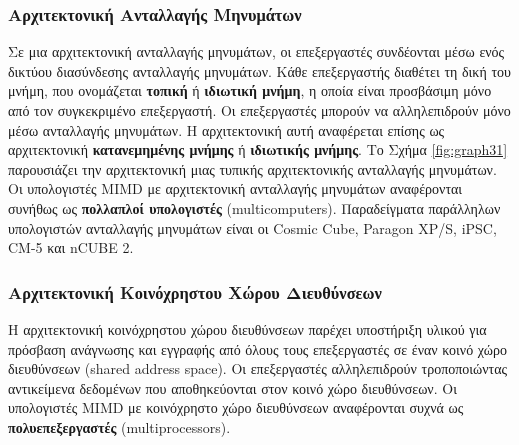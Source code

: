 \documentclass[12pt,a4paper]{article}
\begin{document}
\subsubsection*{Αρχιτεκτονική Ανταλλαγής Μηνυμάτων}
Σε μια αρχιτεκτονική ανταλλαγής μηνυμάτων, οι επεξεργαστές συνδέονται 
μέσω ενός δικτύου διασύνδεσης ανταλλαγής μηνυμάτων.  Κάθε επεξεργαστής 
διαθέτει τη δική του μνήμη, που ονομάζεται \textbf{τοπική} ή \textbf{ιδιωτική μνήμη}, 
η οποία είναι προσβάσιμη μόνο από τον συγκεκριμένο επεξεργαστή. Οι 
επεξεργαστές μπορούν να αλληλεπιδρούν μόνο μέσω ανταλλαγής μηνυμάτων.  
Η αρχιτεκτονική αυτή αναφέρεται επίσης ως αρχιτεκτονική \textbf{κατανεμημένης μνήμης} 
ή \textbf{ιδιωτικής μνήμης}. Το Σχήμα \ref{fig:graph31} παρουσιάζει την αρχιτεκτονική 
μιας τυπικής αρχιτεκτονικής ανταλλαγής μηνυμάτων. Οι υπολογιστές \foreignlanguage{english}{MIMD} 
με αρχιτεκτονική ανταλλαγής μηνυμάτων αναφέρονται συνήθως ως 
\textbf{πολλαπλοί υπολογιστές} (\foreignlanguage{english}{multicomputers}). Παραδείγματα παράλληλων υπολογιστών ανταλλαγής 
μηνυμάτων είναι οι \foreignlanguage{english}{Cosmic Cube, Paragon XP/S, iPSC, CM-5} και \foreignlanguage{english}{nCUBE 2}.

\subsubsection*{Αρχιτεκτονική Κοινόχρηστου Χώρου Διευθύνσεων}
Η αρχιτεκτονική κοινόχρηστου χώρου διευθύνσεων παρέχει υποστήριξη υλικού 
για πρόσβαση ανάγνωσης και εγγραφής από όλους τους επεξεργαστές σε έναν 
κοινό χώρο διευθύνσεων (\foreignlanguage{english}{shared address space}). Οι επεξεργαστές αλληλεπιδρούν τροποποιώντας 
αντικείμενα δεδομένων που αποθηκεύονται στον κοινό χώρο διευθύνσεων. 
Οι υπολογιστές \foreignlanguage{english}{MIMD} με κοινόχρηστο χώρο 
διευθύνσεων αναφέρονται συχνά ως \textbf{πολυεπεξεργαστές} (\foreignlanguage{english}{multiprocessors}).
\end{document}

